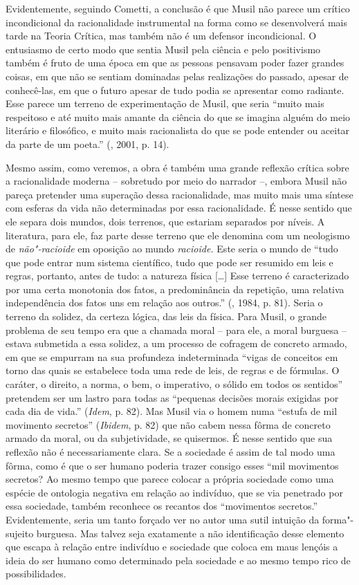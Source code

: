Evidentemente, seguindo Cometti, a conclusão é que Musil não
parece um crítico incondicional da racionalidade instrumental na forma
como se desenvolverá mais tarde na Teoria Crítica, mas também não é um
defensor incondicional. O entusiasmo de certo modo que sentia Musil pela
ciência e pelo positivismo também é fruto de uma época em que as pessoas
pensavam poder fazer grandes coisas, em que não se sentiam dominadas
pelas realizações do passado, apesar de conhecê-las, em que o futuro
apesar de tudo podia se apresentar como radiante. Esse parece um terreno
de experimentação de Musil, que seria ``muito mais respeitoso e até
muito mais amante da ciência do que se imagina alguém do meio literário
e filosófico, e muito mais racionalista do que se pode entender ou
aceitar da parte de um poeta.'' (, 2001, p. 14).

Mesmo assim, como veremos, a obra é também uma grande reflexão crítica
sobre a racionalidade moderna -- sobretudo por meio do narrador --,
embora Musil não pareça pretender uma superação dessa racionalidade, mas
muito mais uma síntese com esferas da vida não determinadas por essa
racionalidade. É nesse sentido que ele separa dois mundos, dois
terrenos, que estariam separados por níveis. A literatura, para ele, faz
parte desse terreno que ele denomina com um neologismo de
\emph{não"-racioide} em oposição ao mundo \emph{racioide.} Este seria o
mundo de ``tudo que pode entrar num sistema científico, tudo que pode
ser resumido em leis e regras, portanto, antes de tudo: a natureza
física [\ldots{}] Esse terreno é caracterizado por uma certa
monotonia dos fatos, a predominância da repetição, uma relativa
independência dos fatos uns em relação aos outros.'' (, 1984, p.
81). Seria o terreno da solidez, da certeza lógica, das leis da física.
Para Musil, o grande problema de seu tempo era que a chamada moral --
para ele, a moral burguesa -- estava submetida a essa solidez, a um
processo de cofragem de concreto armado, em que se empurram na sua
profundeza indeterminada ``vigas de conceitos em torno das quais se
estabelece toda uma rede de leis, de regras e de fórmulas. O caráter, o
direito, a norma, o bem, o imperativo, o sólido em todos os sentidos''
pretendem ser um lastro para todas as ``pequenas decisões morais
exigidas por cada dia de vida.'' (\emph{Idem}, p. 82). Mas Musil via o
homem numa ``estufa de mil movimento secretos'' (\emph{Ibidem}, p. 82)
que não cabem nessa fôrma de concreto armado da moral, ou da
subjetividade, se quisermos. É nesse sentido que sua reflexão não é
necessariamente clara. Se a sociedade é assim de tal modo uma fôrma,
como é que o ser humano poderia trazer consigo esses ``mil movimentos
secretos? Ao mesmo tempo que parece colocar a própria sociedade como uma
espécie de ontologia negativa em relação ao indivíduo, que se via
penetrado por essa sociedade, também reconhece os recantos dos
``movimentos secretos.'' Evidentemente, seria um tanto forçado ver no
autor uma sutil intuição da forma"-sujeito burguesa. Mas talvez seja
exatamente a não identificação desse elemento que escapa à relação entre
indivíduo e sociedade que coloca em maus lençóis a ideia do ser humano
como determinado pela sociedade e ao mesmo tempo rico de possibilidades.

